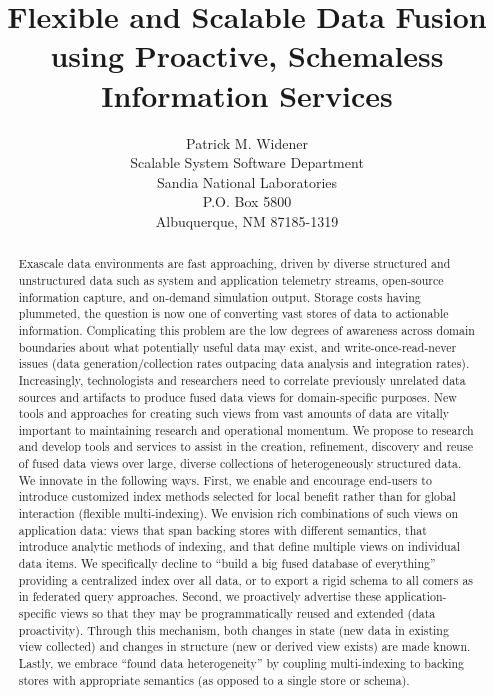 \documentclass[pdf,12pt,report,strict]{SANDreport}
\title{Flexible and Scalable Data Fusion using Proactive, Schemaless Information Services}
\author{Patrick M. Widener\\Scalable System Software Department\\Sandia National
      Laboratories\\P.O. Box 5800\\Albuquerque, NM 87185-1319}		%
\date{}		%
\begin{document}
    \maketitle

    \begin{abstract}
Exascale data environments are fast approaching, driven by diverse structured and unstructured data such
as system and application telemetry streams, open-source information capture, and on-demand simulation
output. Storage costs having plummeted, the question is now one of converting vast stores of data to
actionable information. Complicating this problem are the low degrees of awareness across domain
boundaries about what potentially useful data may exist, and write-once-read-never issues (data
generation/collection rates outpacing data analysis and integration rates). Increasingly, technologists
and researchers need to correlate previously unrelated data sources and artifacts to produce fused data
views for domain-specific purposes. New tools and approaches for creating such views from vast amounts of
data are vitally important to maintaining research and operational momentum. We propose to research and develop tools and services to assist in the creation, refinement, discovery and reuse of fused data views over large, diverse collections of heterogeneously structured data. We innovate in the following ways. First, we enable and encourage end-users to introduce customized index methods selected for local benefit rather than for global interaction (flexible multi-indexing). We envision rich combinations of such views on application data: views that span backing stores with different semantics, that introduce analytic methods of indexing, and that define multiple views on individual data items. We specifically decline to “build a big fused database of everything” providing a centralized index over all data, or to export a rigid schema to all comers as in federated query approaches. Second, we proactively advertise these application-specific views so that they may be programmatically reused and extended (data proactivity). Through this mechanism, both changes in state (new data in existing view collected) and changes in structure (new or derived view exists) are made known. Lastly, we embrace “found data heterogeneity” by coupling multi-indexing to backing stores with appropriate semantics (as opposed to a single store or schema).
     \end{abstract}
\end{document}

